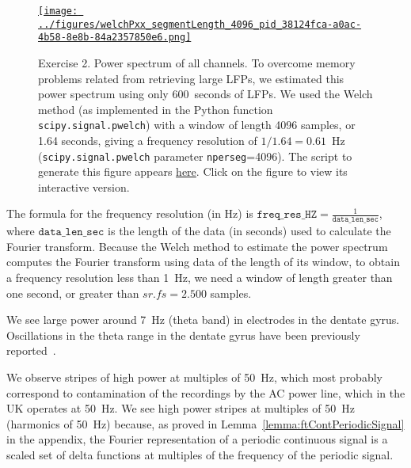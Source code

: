 \documentclass[12pt]{article}
\begin{document}
\begin{figure}[H]
    \begin{center}
        \href{https://www.gatsby.ucl.ac.uk/~rapela/neuroinformatics/2023/ws3/figures/welchPxx_segmentLength_4096_pid_38124fca-a0ac-4b58-8e8b-84a2357850e6.html}{\texttt{[image: ../figures/welchPxx\_segmentLength\_4096\_pid\_38124fca-a0ac-4b58-8e8b-84a2357850e6.png]}}

        \caption{Exercise 2. Power spectrum of all channels. To overcome memory
        problems related from retrieving large LFPs, we estimated this power
        spectrum using only 600~seconds of LFPs. We used the Welch method (as
        implemented in the Python function \texttt{scipy.signal.pwelch}) with a
        window of length 4096 samples, or 1.64 seconds, giving a frequency
        resolution of $1/1.64=0.61$~Hz (\texttt{scipy.signal.pwelch} parameter
        \texttt{nperseg}=4096). The script to generate this figure appears
        \href{https://github.com/joacorapela/neuroinformatics23/blob/master/worksheets/ws3/mySolution/code/scripts/doPlotWelchPxxAllChannels.py}{here}.
        Click on the figure to view its interactive version.  }

                \label{fig:pxxAllChannels}

            \end{center}
        \end{figure}

The formula for the frequency resolution (in Hz) is
$\mathtt{freq\_res\_HZ}=\frac{1}{\mathtt{data\_len\_sec}}$, where
$\mathtt{data\_len\_sec}$ is the length of the data (in seconds) used to
calculate the Fourier transform. Because the Welch method to estimate the power
spectrum computes the Fourier transform using data of the length of its window,
to obtain a frequency resolution less than 1~Hz, we need a window of length
greater than one second, or greater than $sr.fs=2.500$ samples.

We see large power around 7~Hz (theta band) in electrodes in the dentate gyrus.
Oscillations in the theta range in the dentate gyrus have been previously
reported~\citep{rangelEtAl15}.

We observe stripes of high power at multiples of 50~Hz, which most probably
correspond to contamination of the recordings by the AC power line, which in
the UK operates at 50~Hz. We see high power stripes at multiples of 50~Hz
(harmonics of 50~Hz) because, as proved in
Lemma~\ref{lemma:ftContPeriodicSignal} in the appendix, the Fourier representation of a
periodic continuous signal is a scaled set of delta functions at multiples of
the frequency of the periodic signal.
\end{document}
